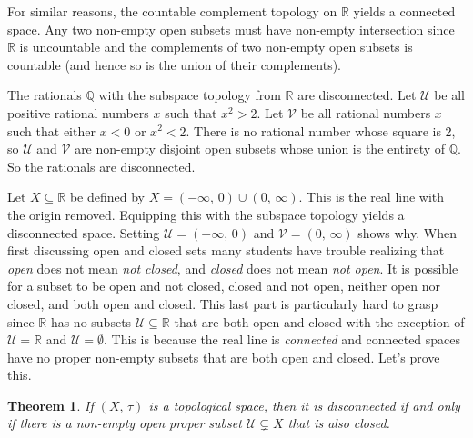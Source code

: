 \documentclass{article}
\theoremstyle{plain}
\newtheorem{theorem}{Theorem}[section]
\theoremstyle{normal}
\newenvironment{example}{%
    \pushQED{\qed}\renewcommand{\qedsymbol}{$\blacksquare$}\examplex%
}{%
    \popQED\endexamplex%
}
\begin{document}
        \begin{example}
            For similar reasons, the countable complement topology on
            $\mathbb{R}$ yields a connected space. Any two non-empty open
            subsets must have non-empty intersection since $\mathbb{R}$ is
            uncountable and the complements of two non-empty open subsets is
            countable (and hence so is the union of their complements).
        \end{example}
        \begin{example}
            The rationals $\mathbb{Q}$ with the subspace topology from
            $\mathbb{R}$ are disconnected. Let $\mathcal{U}$ be all positive
            rational numbers $x$ such that $x^{2}>2$. Let $\mathcal{V}$ be
            all rational numbers $x$ such that either $x<0$ or $x^{2}<2$. There
            is no rational number whose square is 2, so $\mathcal{U}$ and
            $\mathcal{V}$ are non-empty disjoint open subsets whose union is
            the entirety of $\mathbb{Q}$. So the rationals are disconnected. 
        \end{example}
        \begin{example}
            Let $X\subseteq\mathbb{R}$ be defined by
            $X=(-\infty,\,0)\cup(0,\,\infty)$. This is the real line with the
            origin removed. Equipping this with the subspace topology yields a
            disconnected space. Setting $\mathcal{U}=(-\infty,\,0)$ and
            $\mathcal{V}=(0,\,\infty)$ shows why.
        \end{example}
        When first discussing open and closed sets many students have trouble
        realizing that \textit{open} does not mean \textit{not closed}, and
        \textit{closed} does not mean \textit{not open}. It is possible for a
        subset to be open and not closed, closed and not open, neither open nor
        closed, and both open and closed. This last part is particularly hard to
        grasp since $\mathbb{R}$ has no subsets $\mathcal{U}\subseteq\mathbb{R}$
        that are both open and closed with the exception of
        $\mathcal{U}=\mathbb{R}$ and $\mathcal{U}=\emptyset$. This is because
        the real line is \textit{connected} and connected spaces have no
        proper non-empty subsets that are both open and closed. Let's prove
        this.
        \begin{theorem}
            If $(X,\,\tau)$ is a topological space, then it is disconnected
            if and only if there is a non-empty open proper subset
            $\mathcal{U}\subsetneq{X}$ that is also closed.
        \end{theorem}
\end{document}
